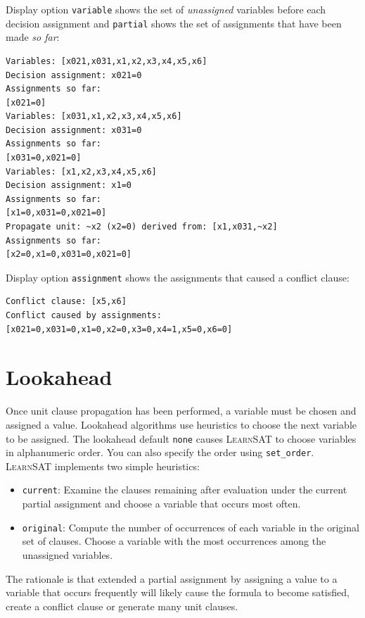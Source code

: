 \documentclass[11pt]{report}
\newcommand*{\p}[1]{\textup{\texttt{#1}}}
\newcommand*{\ls}{\textsc{LearnSAT}}
\begin{document}
Display option \p{variable} shows the set of \emph{unassigned} variables before each decision assignment and \p{partial} shows the set of assignments that have been made \emph{so far}:

\begin{verbatim}
Variables: [x021,x031,x1,x2,x3,x4,x5,x6]
Decision assignment: x021=0
Assignments so far:
[x021=0]
Variables: [x031,x1,x2,x3,x4,x5,x6]
Decision assignment: x031=0
Assignments so far:
[x031=0,x021=0]
Variables: [x1,x2,x3,x4,x5,x6]
Decision assignment: x1=0
Assignments so far:
[x1=0,x031=0,x021=0]
Propagate unit: ~x2 (x2=0) derived from: [x1,x031,~x2]
Assignments so far:
[x2=0,x1=0,x031=0,x021=0]
\end{verbatim}

Display option \p{assignment} shows the assignments that caused a conflict clause:
\begin{verbatim}
Conflict clause: [x5,x6]
Conflict caused by assignments:
[x021=0,x031=0,x1=0,x2=0,x3=0,x4=1,x5=0,x6=0]
\end{verbatim}


\section{Lookahead}\label{s.look}

Once unit clause propagation has been performed, a variable must be chosen and assigned a value. Lookahead algorithms use heuristics to choose the next variable to be assigned. The lookahead default \p{none} causes \ls{} to choose variables in alphanumeric order. You can also specify the order using \p{set\_order}. \ls{} implements two simple heuristics:
\begin{itemize}
\item \p{current}: Examine the clauses remaining after evaluation under the current partial assignment and choose a variable that occurs most often. 
\item \p{original}: Compute the number of occurrences of each variable in the original set of clauses. Choose a variable with the most occurrences among the unassigned variables.
\end{itemize}
The rationale is that extended a partial assignment by assigning a value to a variable that occurs frequently will likely cause the formula to become satisfied, create a conflict clause or generate many unit clauses.
\end{document}
